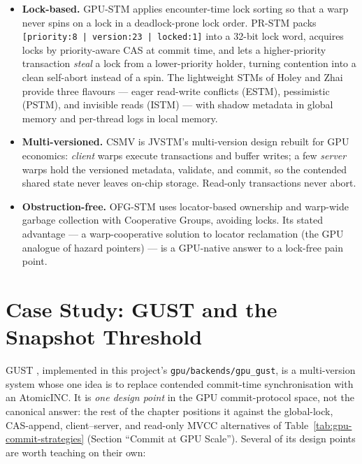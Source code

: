 \begin{itemize}
    \item \textbf{Lock-based.} GPU-STM \cite{xu14gpustm} applies
          encounter-time lock sorting so that a warp never spins on a lock in
          a deadlock-prone lock order. PR-STM \cite{shen15prstm} packs
          \texttt{[priority:8 | version:23 | locked:1]} into a 32-bit lock
          word, acquires locks by priority-aware CAS at commit time, and lets
          a higher-priority transaction \emph{steal} a lock from a
          lower-priority holder, turning contention into a clean self-abort
          instead of a spin. The lightweight STMs of Holey and Zhai
          \cite{holey14} provide three flavours --- eager read-write
          conflicts (ESTM), pessimistic (PSTM), and invisible reads (ISTM)
          --- with shadow metadata in global memory and per-thread logs in
          local memory.
    \item \textbf{Multi-versioned.} CSMV \cite{nunes22csmv} is JVSTM's
          multi-version design \cite{cachopo06} rebuilt for GPU economics:
          \emph{client} warps execute transactions and buffer writes; a few
          \emph{server} warps hold the versioned metadata, validate, and
          commit, so the contended shared state never leaves on-chip storage.
          Read-only transactions never abort.
    \item \textbf{Obstruction-free.} OFG-STM \cite{perlin24ofg} uses
          locator-based ownership and warp-wide garbage collection with
          Cooperative Groups, avoiding locks. Its stated advantage --- a
          warp-cooperative solution to locator reclamation (the GPU analogue
          of hazard pointers) --- is a GPU-native answer to a lock-free
          pain point.
\end{itemize}

\section{Case Study: GUST and the Snapshot Threshold}
\label{sec:gust}

GUST \cite{nunes23gust}, implemented in this project's
\texttt{gpu/backends/gpu\_gust}, is a multi-version system whose one idea is
to replace contended commit-time synchronisation with an AtomicINC. It is
\emph{one design point} in the GPU commit-protocol space, not the canonical
answer: the rest of the chapter positions it against the global-lock,
CAS-append, client--server, and read-only MVCC alternatives of
Table~\ref{tab:gpu-commit-strategies} (Section ``Commit at GPU Scale'').
Several of
its design points are worth teaching on their own:

